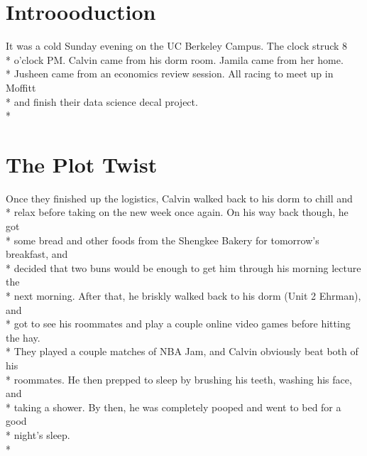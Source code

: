\documentclass{article}
\begin{document}
\section{Introooduction}

It was a cold Sunday evening on the UC Berkeley Campus. The clock struck 8 \\*
o'clock PM. Calvin came from his dorm room. Jamila came from her home. \\*
Jusheen came from an economics review session. All racing to meet up in Moffitt \\*
and finish their data science decal project. \\*

\section{The Plot Twist}

Once they finished up the logistics, Calvin walked back to his dorm to chill and \\*
relax before taking on the new week once again. On his way back though, he got \\*
some bread and other foods from the Shengkee Bakery for tomorrow's breakfast, and \\*
decided that two buns would be enough to get him through his morning lecture the \\*
next morning. After that, he briskly walked back to his dorm (Unit 2 Ehrman), and \\*
got to see his roommates and play a couple online video games before hitting the hay. \\*
They played a couple matches of NBA Jam, and Calvin obviously beat both of his \\*
roommates. He then prepped to sleep by brushing his teeth, washing his face, and \\*
taking a shower. By then, he was completely pooped and went to bed for a good \\*
night's sleep. \\*
\end{document}
